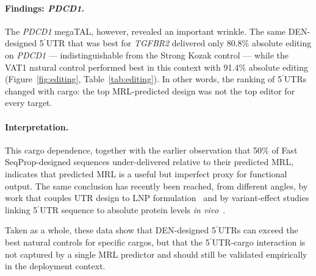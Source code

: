 \documentclass[11pt]{article}
\begin{document}
\paragraph{Findings: \emph{PDCD1}.} The \emph{PDCD1} megaTAL, however,
revealed an important wrinkle. The same DEN-designed 5$^\prime$UTR that
was best for \emph{TGFBR2} delivered only 80.8\% absolute editing on
\emph{PDCD1} --- indistinguishable from the Strong Kozak control ---
while the VAT1 natural control performed best in this context with
91.4\% absolute editing (Figure~\ref{fig:editing},
Table~\ref{tab:editing}). In other words, the ranking of 5$^\prime$UTRs
changed with cargo: the top MRL-predicted design was not the top editor
for every target.

\paragraph{Interpretation.} This cargo dependence, together with the
earlier observation that 50\% of Fast SeqProp-designed sequences
under-delivered relative to their predicted MRL, indicates that
predicted MRL is a useful but imperfect proxy for functional output.
The same conclusion has recently been reached, from different angles,
by work that couples UTR design to LNP formulation~\citep{kim2026lnp_utr}
and by variant-effect studies linking 5$^\prime$UTR sequence to
absolute protein levels \emph{in vivo}~\citep{chaldebas2026utrvariants}.

Taken as a whole, these data show that DEN-designed
5$^\prime$UTRs can exceed the best natural controls for specific
cargos, but that the 5$^\prime$UTR-cargo interaction is not captured
by a single MRL predictor and should still be validated empirically
in the deployment context.
\end{document}

